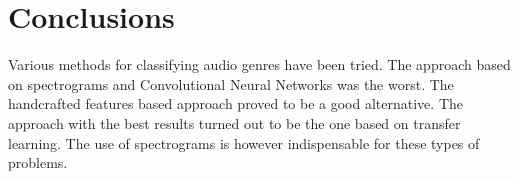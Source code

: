 \section{Conclusions}
Various methods for classifying audio genres have been tried.
The approach based on spectrograms and Convolutional Neural Networks was the worst. 
The handcrafted features based approach proved to be a good alternative. 
The approach with the best results turned out to be the one based on transfer learning.
The use of spectrograms is however indispensable for these types of problems.
